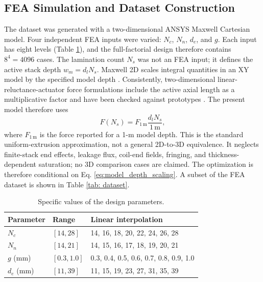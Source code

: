 \subsection{FEA Simulation and Dataset Construction}
The dataset was generated with a two-dimensional ANSYS Maxwell Cartesian model. Four independent FEA inputs were varied: $N_c$, $N_n$, $d_e$, and $g$. Each input has eight levels (Table \ref{tab:parameters_range}), and the full-factorial design therefore contains $8^4=4096$ cases. The lamination count $N_s$ was not an FEA input; it defines the active stack depth $w_m=d_lN_s$. Maxwell 2D scales integral quantities in an XY model by the specified model depth \cite{ansysModelSettings,ansysModelDepth}. Consistently, two-dimensional linear-reluctance-actuator force formulations include the active axial length as a multiplicative factor and have been checked against prototypes \cite{garcia2018linear}. The present model therefore uses
\begin{equation}
 F(N_s)=F_{1\,\mathrm{m}}\frac{d_lN_s}{1\,\mathrm{m}},
 \label{eq:model_depth_scaling}
\end{equation}
where $F_{1\,\mathrm{m}}$ is the force reported for a 1-m model depth. This is the standard uniform-extrusion approximation, not a general 2D-to-3D equivalence. It neglects finite-stack end effects, leakage flux, coil-end fields, fringing, and thickness-dependent saturation; no 3D comparison cases are claimed. The optimization is therefore conditional on Eq. \ref{eq:model_depth_scaling}. A subset of the FEA dataset is shown in Table \ref{tab: dataset}.
\renewcommand\arraystretch{1}
\begin{table}[!t]
	\scriptsize
	\centering
	\caption{Specific values of the design parameters.}
	\label{tab:parameters_range}
	\begin{tabular}{lll}
		\toprule
		Parameter & Range & Linear interpolation \\
		\midrule
		
		$N_c$ &
		$[14,28]$ &
		14, 16, 18, 20, 22, 24, 26, 28 \\
		
		$N_n$ &
		$[14,21]$ &
		14, 15, 16, 17, 18, 19, 20, 21 \\
		
		$g$ (mm) &
		$[0.3,1.0]$ &
		0.3, 0.4, 0.5, 0.6, 0.7, 0.8, 0.9, 1.0 \\
		
		$d_e$ (mm) &
		$[11,39]$ &
		11, 15, 19, 23, 27, 31, 35, 39 \\
		
		\bottomrule
	\end{tabular}
\end{table}

